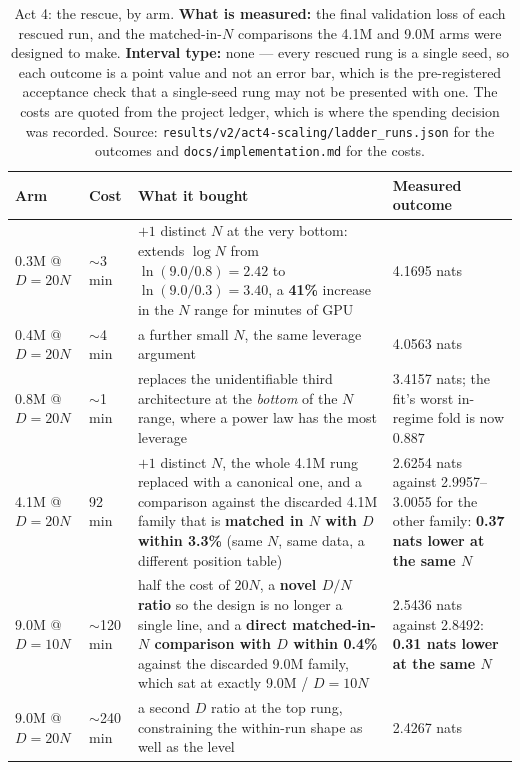\documentclass[11pt,a4paper]{article}
\begin{document}
\begin{table}[H]
\centering
\begin{tabular}{L{2.3cm}R{1.5cm}L{6.0cm}L{4.2cm}}
\toprule
Arm & Cost & What it bought & Measured outcome \\
\midrule
0.3M @ $D = 20N$ & $\sim$3 min & $+1$ distinct $N$ at the very bottom: extends
$\log N$ from $\ln(9.0/0.8) = 2.42$ to $\ln(9.0/0.3) = 3.40$, a \textbf{41\%}
increase in the $N$ range for minutes of GPU & 4.1695 nats \\
0.4M @ $D = 20N$ & $\sim$4 min & a further small $N$, the same leverage argument & 4.0563 nats \\
0.8M @ $D = 20N$ & $\sim$1 min & replaces the unidentifiable third architecture
at the \emph{bottom} of the $N$ range, where a power law has the most
leverage & 3.4157 nats; the fit's worst in-regime fold is now $0.887$ \\
4.1M @ $D = 20N$ & 92 min & $+1$ distinct $N$, the whole 4.1M rung replaced with
a canonical one, and a comparison against the discarded 4.1M family that is
\textbf{matched in $N$ with $D$ within 3.3\%} (same $N$, same data, a
different position table) & 2.6254 nats against 2.9957--3.0055 for the other
family: \textbf{0.37 nats lower at the same $N$} \\
9.0M @ $D = 10N$ & $\sim$120 min & half the cost of $20N$, a \textbf{novel $D/N$
ratio} so the design is no longer a single line, and a \textbf{direct
matched-in-$N$ comparison with $D$ within 0.4\%} against the discarded 9.0M
family, which sat at exactly 9.0M / $D = 10N$ & 2.5436 nats against 2.8492:
\textbf{0.31 nats lower at the same $N$} \\
9.0M @ $D = 20N$ & $\sim$240 min & a second $D$ ratio at the top rung,
constraining the within-run shape as well as the level & 2.4267 nats \\
\bottomrule
\end{tabular}
\caption{Act 4: the rescue, by arm. \textbf{What is measured:} the final
validation loss of each rescued run, and the matched-in-$N$ comparisons the
4.1M and 9.0M arms were designed to make. \textbf{Interval type:} none --- every
rescued rung is a single seed, so each outcome is a point value and not an
error bar, which is the pre-registered acceptance check that a single-seed rung
may not be presented with one. The costs are quoted from the project ledger,
which is where the spending decision was recorded. Source:
\texttt{results/v2/act4-scaling/ladder\_runs.json} for the outcomes and
\texttt{docs/implementation.md} for the costs.}
\label{tab:act4-rescue}
\end{table}
\end{document}
